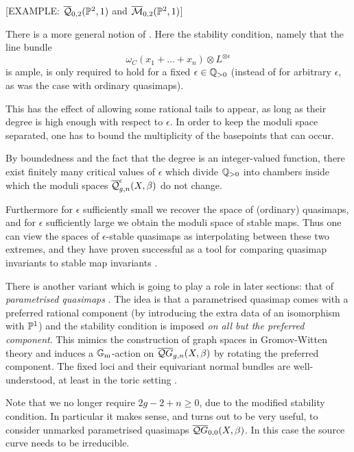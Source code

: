 [EXAMPLE: $\overline{\mathcal Q}_{0,2}(\mathbb P^2,1)$ and $\overline{\mathcal M}_{0,2}(\mathbb P^2,1)$]

\begin{remark}
 There is a more general notion of  \cite[\S 7.1]{CFKM}. Here the stability condition, namely that the line bundle
\begin{equation*} \omega_C(x_1 + \ldots + x_n)\otimes L^{\otimes \epsilon} \end{equation*} 
is ample, is only required to hold for a fixed $\epsilon \in \mathbb{Q}_{>0}$ (instead of for arbitrary $\epsilon$, as was the case with ordinary quasimaps).

This has the effect of allowing some rational tails to appear, as long as their degree is high enough with respect to $\epsilon$. In order to keep the moduli space separated, one has to bound the multiplicity of the basepoints that can occur.

By boundedness and the fact that the degree is an integer-valued function, there exist finitely many critical values of $\epsilon$ which divide $\mathbb{Q}_{>0}$ into chambers inside which the moduli spaces $\overline{\mathcal Q}^{\epsilon}_{g,n}(X,\beta)$ do not change.

Furthermore for $\epsilon$ sufficiently small we recover the space of (ordinary) quasimaps, and for $\epsilon$ sufficiently large we obtain the moduli space of stable maps. Thus one can view the spaces of $\epsilon$-stable quasimaps as interpolating between these two extremes, and they have proven  successful as a tool for comparing quasimap invariants to stable map invariants \cite{CF-K-wallcrossing}.
\end{remark}

\begin{remark}
There is another variant which is going to play a role in later sections: that of \emph{parametrised quasimaps} \cite[\S 7]{CF-K}. The idea is that a parametrised quasimap comes with a preferred rational component (by introducing the extra data of an isomorphism with $\mathbb P^1$) and the stability condition is imposed \emph{on all but the preferred component}. This mimics the construction of graph spaces in Gromov-Witten theory and induces a $\mathbb{G}_{\text{m}}$-action on $\overline{\mathcal QG}_{g,n}(X,\beta)$ by rotating the preferred component. The fixed loci and their equivariant normal bundles are well-understood, at least in the toric setting \cite[\S 7]{CF-K}.
 
Note that we no longer require $2g-2+n\geq 0$, due to the modified stability condition. In particular it makes sense, and turns out to be very useful, to consider unmarked parametrised quasimaps $\overline{\mathcal QG}_{0,0}(X,\beta)$. In this case the source curve needs to be irreducible. 
\end{remark}

